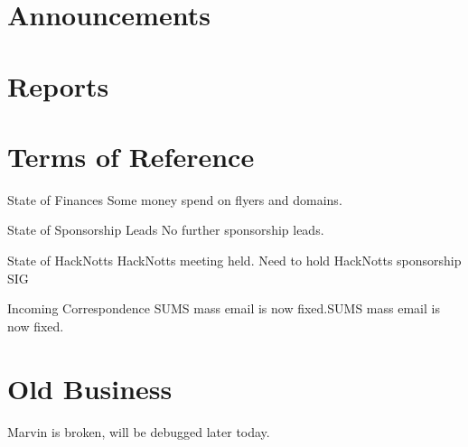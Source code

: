 \documentclass[11pt,hacksoc]{meetingmins}
\begin{document}
\maketitle

\section{Announcements}
\begin{items}
  \item
\end{items}

\section{Reports}

\section{Terms of Reference}
\begin{items}
\item {State of Finances}
\subitem Some money spend on flyers and domains.
\item {State of Sponsorship Leads}
\subitem No further sponsorship leads.
\item {State of HackNotts}
\subitem HackNotts meeting held.
\subitem Need to hold HackNotts sponsorship SIG
\item {Incoming Correspondence}
\subitem SUMS mass email is now fixed.SUMS mass email is now fixed.
\end{items}
\section{Old Business}
\begin{items}
  \item Marvin is broken, will be debugged later today.
\end{items}
\end{document}
